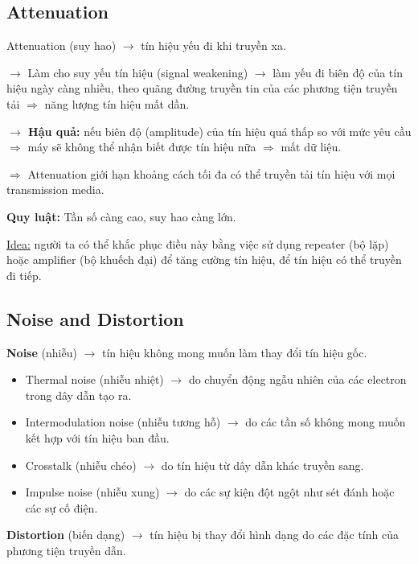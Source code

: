 \subsection{Attenuation}

\noindent
Attenuation (suy hao) $\rightarrow$ tín hiệu yếu đi khi truyền xa.

$\rightarrow$ Làm cho suy yếu tín hiệu (signal weakening) $\rightarrow$ làm yếu đi biên độ của tín hiệu ngày càng nhiều, theo quãng đường truyền tin của các phương tiện truyền tải $\Rightarrow$ năng lượng tín hiệu mất dần.
\medskip

\noindent
\textbf{$\rightarrow$ Hậu quả:} nếu biên độ (amplitude) của tín hiệu quá thấp so với mức yêu cầu $\Rightarrow$ máy sẽ không thể nhận biết được tín hiệu nữa $\Rightarrow$ mất dữ liệu.

$\Rightarrow$ Attenuation giới hạn khoảng cách tối đa có thể truyền tải tín hiệu với mọi transmission media.
\medskip

\noindent
\textbf{Quy luật:} Tần số càng cao, suy hao càng lớn.
\medskip

\noindent
\underline{Idea:} người ta có thể khắc phục điều này bằng việc sử dụng repeater (bộ lặp) hoặc amplifier (bộ khuếch đại) để tăng cường tín hiệu, để tín hiệu có thể truyền đi tiếp.
\medskip

\subsection{Noise and Distortion}

\noindent
\textbf{Noise} (nhiễu) $\rightarrow$ tín hiệu không mong muốn làm thay đổi tín hiệu gốc.

\begin{itemize}
    \item Thermal noise (nhiễu nhiệt) $\rightarrow$ do chuyển động ngẫu nhiên của các electron trong dây dẫn tạo ra.
    \item Intermodulation noise (nhiễu tương hỗ) $\rightarrow$ do các tần số không mong muốn kết hợp với tín hiệu ban đầu.
    \item Crosstalk (nhiễu chéo) $\rightarrow$ do tín hiệu từ dây dẫn khác truyền sang.
    \item Impulse noise (nhiễu xung) $\rightarrow$ do các sự kiện đột ngột như sét đánh hoặc các sự cố điện.
\end{itemize}
\medskip

\noindent
\textbf{Distortion} (biến dạng) $\rightarrow$ tín hiệu bị thay đổi hình dạng do các đặc tính của phương tiện truyền dẫn.

